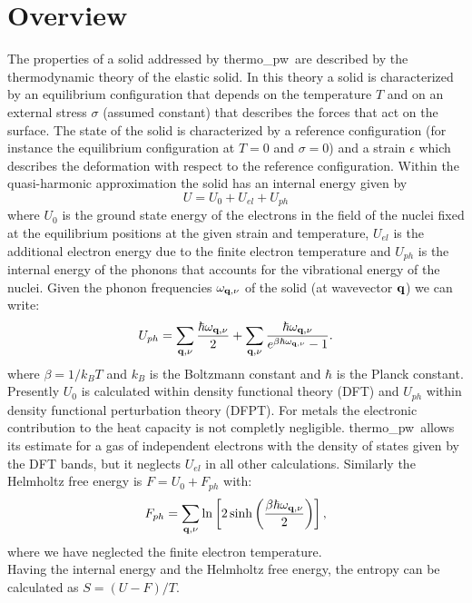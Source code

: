 \documentclass[12pt,a4paper]{article}
\def\tpw{{\sc thermo\_pw}}
\begin{document}
\section{\color{coral}Overview}
The properties of a solid addressed by \tpw\ are described by the thermodynamic
theory of the elastic solid. In this theory a solid is characterized by an
equilibrium configuration that depends on the temperature $T$ and on an
external stress $\sigma$ (assumed constant) that describes the forces 
that act on the surface. The state
of the solid is characterized by a reference configuration 
(for instance the equilibrium configuration at $T=0$ and $\sigma=0$) and 
a strain $\epsilon$ which describes the deformation with respect to the 
reference configuration. 
Within the quasi-harmonic approximation the solid has an internal
energy given by  
\begin{equation}
U=U_0 + U_{el} + U_{ph}
\end{equation}
where $U_0$ is the ground state energy of the electrons in the field 
of the nuclei fixed at the equilibrium positions at the given strain and
temperature, $U_{el}$ is the additional electron energy due to the 
finite electron temperature and $U_{ph}$ is the internal energy of the 
phonons that accounts for the vibrational energy of the nuclei. 
Given the phonon frequencies $\omega_{{\bf q},\nu}$ of the solid 
(at wavevector ${\bf q}$) we can write:
\begin{equation}
U_{ph} = \sum_{{\bf q},\nu} {\hbar \omega_{{\bf q},\nu} \over 2}
+ \sum_{{\bf q},\nu} {\hbar \omega_{{\bf q},\nu} \over 
e^{\beta \hbar \omega_{{\bf q},\nu}}-1}.
\label{uvib}
\end{equation}
where $\beta=1/ k_B T$ and $k_B$ is the Boltzmann constant and $\hbar$ is the
Planck constant.
Presently $U_0$ is calculated within density functional theory (DFT) and
$U_{ph}$ within density functional perturbation theory (DFPT). 
For metals the electronic contribution to the heat capacity is not 
completly negligible. \tpw\ allows its estimate for a gas of 
independent electrons with the density of states given by the DFT bands,
but it neglects $U_{el}$ in all other calculations.
Similarly the Helmholtz free energy is $F=U_0+F_{ph}$ with:
\begin{equation}
F_{ph} = \sum_{{\bf q},\nu} \ln \left[ 2 \sinh \left({\beta \hbar 
\omega_{{\bf q},\nu} \over 2}\right) \right],
\nonumber
\end{equation}
where we have neglected the finite electron temperature. \\
Having the internal energy and the Helmholtz free energy, the entropy can 
be calculated as $S=(U-F)/T$.
\end{document}
